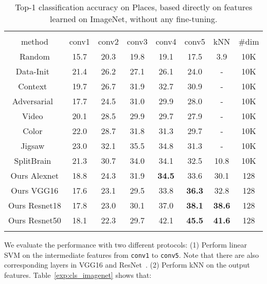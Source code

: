 \begin{table}[t]
	\setlength{\tabcolsep}{1.1pt}
	\centering
	\begin{tabular}{c|ccccc|c|c}
		\Xhline{2\arrayrulewidth}
		\multicolumn{8}{c}{Image Classification Accuracy on Places} \\
		\Xhline{2\arrayrulewidth}
		method & conv1 & conv2 & conv3 & conv4 & conv5 & kNN & \#dim  \\
		\hline
Random &  15.7 & 20.3 & 19.8 & 19.1 & 17.5 & 3.9 & 10K \\
Data-Init~\cite{krahenbuhl2015data} &  21.4 & 26.2 & 27.1 & 26.1 & 24.0 & - & 10K \\
Context~\cite{doersch2015unsupervised} & 19.7 & 26.7 & 31.9 & 32.7 & 30.9 & - & 10K \\
		Adversarial~\cite{donahue2016adversarial} &  17.7 & 24.5 & 31.0 & 29.9 & 28.0 & - & 10K \\
		Video~\cite{wang2015unsupervised} & 20.1 & 28.5 & 29.9 & 29.7 & 27.9 & - & 10K \\
		Color~\cite{zhang2016colorful} & 22.0 & 28.7 & 31.8 & 31.3 & 29.7 & - & 10K \\
		Jigsaw~\cite{noroozi2016unsupervised} & 23.0 & 32.1 & 35.5 & 34.8 & 31.3 & - & 10K\\
		SplitBrain~\cite{zhang2017split} & 21.3 & 30.7 & 34.0 & 34.1 & 32.5 & 10.8 & 10K \\
		\Xhline{2\arrayrulewidth}
		Ours Alexnet & 18.8 & 24.3 & 31.9 & \textbf{34.5} & 33.6 & 30.1 & 128 \\
		Ours VGG16 & 17.6 & 23.1 &  29.5 & 33.8 & \textbf{36.3} & 32.8 & 128 \\
		Ours Resnet18 & 17.8 & 23.0 & 30.1 & 37.0 & \textbf{38.1} & \textbf{38.6} & 128\\
		Ours Resnet50 & 18.1 & 22.3 & 29.7 & 42.1 & \textbf{45.5} & \textbf{41.6} & 128\\
		\Xhline{2\arrayrulewidth}
	\end{tabular}
	\caption{\small
        Top-1 classification accuracy on Places,  based directly on features learned on ImageNet, without any fine-tuning.
    }
\label{exp:cls_places}
\end{table}
 


We evaluate the performance with two different protocols:
(1) Perform linear SVM on the intermediate features from
\texttt{conv1} to \texttt{conv5}. Note that 
there are also corresponding layers in VGG16 and ResNet~\cite{simonyan2014very,he2015deep}.
(2) Perform kNN on the output features.
Table~\ref{exp:cls_imagenet} shows that:


